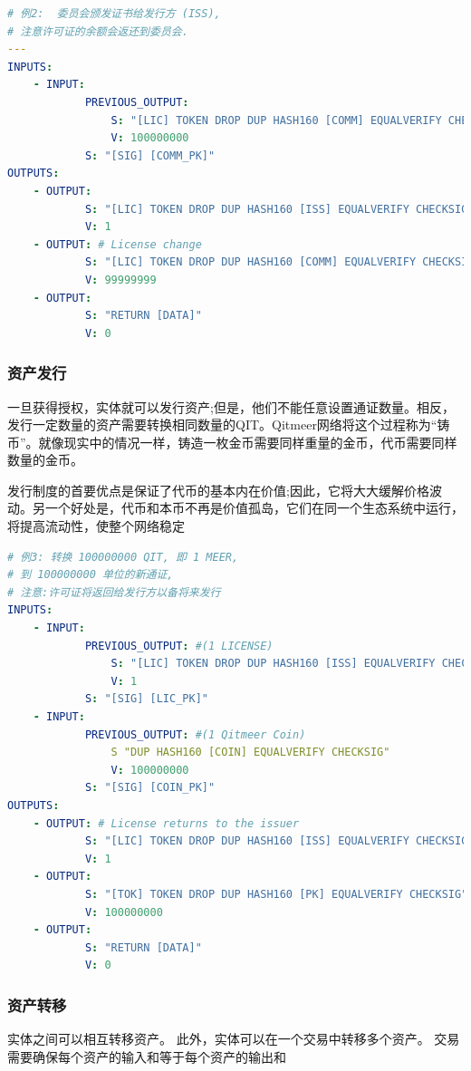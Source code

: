 \documentclass[a4paper,11pt]{article}
\begin{document}
\lstset{basicstyle=\tiny,style=myListStyle}
\begin{lstlisting}[language=yaml, numbers=none,basicstyle=\footnotesize]
# 例2:  委员会颁发证书给发行方 (ISS),
# 注意许可证的余额会返还到委员会.
---
INPUTS:
	- INPUT:
			PREVIOUS_OUTPUT:
				S: "[LIC] TOKEN DROP DUP HASH160 [COMM] EQUALVERIFY CHECKSIG"
				V: 100000000
			S: "[SIG] [COMM_PK]"
OUTPUTS:
	- OUTPUT:
			S: "[LIC] TOKEN DROP DUP HASH160 [ISS] EQUALVERIFY CHECKSIG"
			V: 1
	- OUTPUT: # License change
			S: "[LIC] TOKEN DROP DUP HASH160 [COMM] EQUALVERIFY CHECKSIG"
			V: 99999999
	- OUTPUT:
			S: "RETURN [DATA]"
			V: 0
\end{lstlisting}

\subsubsection{资产发行}
一旦获得授权，实体就可以发行资产;但是，他们不能任意设置通证数量。相反，发行一定数量的资产需要转换相同数量的QIT。Qitmeer网络将这个过程称为“铸币”。就像现实中的情况一样，铸造一枚金币需要同样重量的金币，代币需要同样数量的金币。

发行制度的首要优点是保证了代币的基本内在价值;因此，它将大大缓解价格波动。另一个好处是，代币和本币不再是价值孤岛，它们在同一个生态系统中运行，将提高流动性，使整个网络稳定

\lstset{basicstyle=\tiny,style=myListStyle}
\begin{lstlisting}[language=yaml, numbers=none,basicstyle=\footnotesize]
# 例3: 转换 100000000 QIT, 即 1 MEER,
# 到 100000000 单位的新通证,
# 注意:许可证将返回给发行方以备将来发行
INPUTS:
	- INPUT:
			PREVIOUS_OUTPUT: #(1 LICENSE)
				S: "[LIC] TOKEN DROP DUP HASH160 [ISS] EQUALVERIFY CHECKSIG"
				V: 1
			S: "[SIG] [LIC_PK]"
	- INPUT:
			PREVIOUS_OUTPUT: #(1 Qitmeer Coin)
				S "DUP HASH160 [COIN] EQUALVERIFY CHECKSIG"
				V: 100000000
			S: "[SIG] [COIN_PK]"
OUTPUTS:
	- OUTPUT: # License returns to the issuer
			S: "[LIC] TOKEN DROP DUP HASH160 [ISS] EQUALVERIFY CHECKSIG"
			V: 1
	- OUTPUT:
			S: "[TOK] TOKEN DROP DUP HASH160 [PK] EQUALVERIFY CHECKSIG"
			V: 100000000
	- OUTPUT:
			S: "RETURN [DATA]"
			V: 0
\end{lstlisting}

\subsubsection{资产转移}

实体之间可以相互转移资产。
此外，实体可以在一个交易中转移多个资产。
交易需要确保每个资产的输入和等于每个资产的输出和
\end{document}
